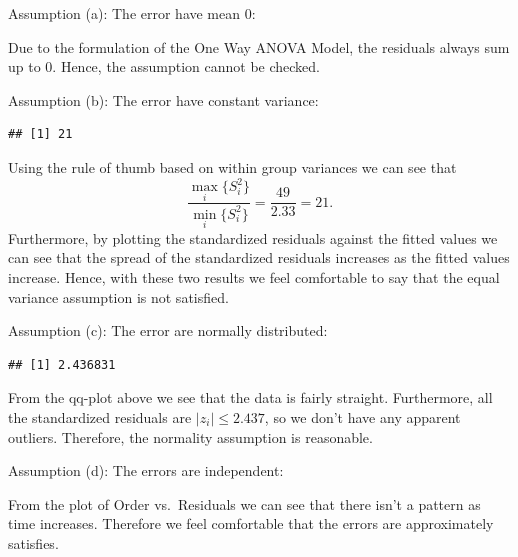 \documentclass[12pt,]{article}
\newenvironment{Shaded}{\begin{snugshade}}{\end{snugshade}}
\newcommand{\KeywordTok}[1]{\textcolor[rgb]{0.13,0.29,0.53}{\textbf{#1}}}
\newcommand{\StringTok}[1]{\textcolor[rgb]{0.31,0.60,0.02}{#1}}
\newcommand{\OperatorTok}[1]{\textcolor[rgb]{0.81,0.36,0.00}{\textbf{#1}}}
\newcommand{\NormalTok}[1]{#1}
\begin{document}
Assumption (a): The error have mean 0:

Due to the formulation of the One Way ANOVA Model, the residuals always
sum up to 0. Hence, the assumption cannot be checked.

Assumption (b): The error have constant variance:

\begin{Shaded}
\end{Shaded}

\begin{verbatim}
## [1] 21
\end{verbatim}

Using the rule of thumb based on within group variances we can see that
\[\frac{\max_i\{S_i^2 \}}{\min_i\{S_i^2 \}} =\frac{49}{2.33} = 21.\]
Furthermore, by plotting the standardized residuals against the fitted
values we can see that the spread of the standardized residuals
increases as the fitted values increase. Hence, with these two results
we feel comfortable to say that the equal variance assumption is not
satisfied.

Assumption (c): The error are normally distributed:

\begin{Shaded}
\end{Shaded}

\begin{verbatim}
## [1] 2.436831
\end{verbatim}

From the qq-plot above we see that the data is fairly straight.
Furthermore, all the standardized residuals are \(|z_i| \leq 2.437\), so
we don't have any apparent outliers. Therefore, the normality assumption
is reasonable.

Assumption (d): The errors are independent:

From the plot of Order vs.~Residuals we can see that there isn't a
pattern as time increases. Therefore we feel comfortable that the errors
are approximately satisfies.
\end{document}
